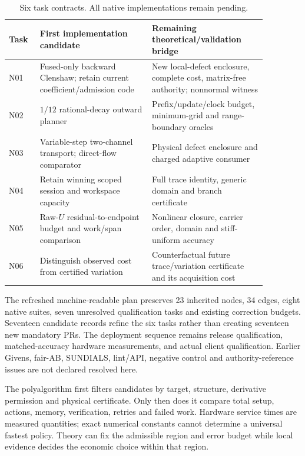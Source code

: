 \documentclass[aps,pra,reprint,onecolumn,11pt,notitlepage,nofootinbib]{revtex4-2}
\begin{document}
\begin{table}[h]
\caption{Six task contracts. All native implementations remain pending.}
\begin{tabular}{L{0.10\linewidth}L{0.38\linewidth}L{0.39\linewidth}}
\toprule
Task & First implementation candidate & Remaining theoretical/validation bridge\\
\midrule
N01 & Fused-only backward Clenshaw; retain current coefficient/admission code &
New local-defect enclosure, complete cost, matrix-free authority; nonnormal witness\\
N02 & $1/12$ rational-decay outward planner & Prefix/update/clock budget,
minimum-grid and range-boundary oracles\\
N03 & Variable-step two-channel transport; direct-flow comparator & Physical
defect enclosure and charged adaptive consumer\\
N04 & Retain winning scoped session and workspace capacity & Full trace
identity, generic domain and branch certificate\\
N05 & Raw-$U$ residual-to-endpoint budget and work/span comparison & Nonlinear
closure, carrier order, domain and stiff-uniform accuracy\\
N06 & Distinguish observed cost from certified variation & Counterfactual
future trace/variation certificate and its acquisition cost\\
\bottomrule
\end{tabular}
\end{table}

The refreshed machine-readable plan preserves 23 inherited nodes, 34 edges,
eight native suites, seven unresolved qualification tasks and existing
correction budgets. Seventeen candidate records refine the six tasks rather
than creating seventeen new mandatory PRs. The deployment sequence remains
release qualification, matched-accuracy hardware measurements, and actual
client qualification. Earlier Givens, fair-AB, SUNDIALS, lint/API, negative
control and authority-reference issues are not declared resolved here.

The polyalgorithm first filters candidates by target, structure, derivative
permission and physical certificate. Only then does it compare total setup,
actions, memory, verification, retries and failed work. Hardware service
times are measured quantities; exact numerical constants cannot determine
a universal fastest policy. Theory can fix the admissible region and error
budget while local evidence decides the economic choice within that region.
\end{document}
